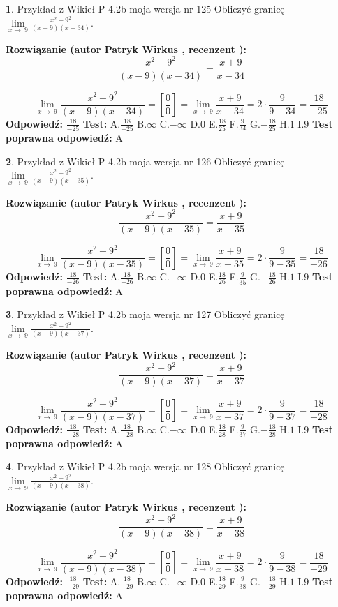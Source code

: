 \documentclass[12pt, a4paper]{article}
\theoremstyle{definition} %
\newtheorem{zad}{}
\newcommand{\zadStart}[1]{\begin{zad}#1\newline}
\newcommand{\zadStop}{\end{zad}}
\newcommand{\rozwStart}[2]{\noindent \textbf{Rozwiązanie (autor #1 , recenzent #2): }\newline}
\newcommand{\rozwStop}{\newline}
\newcommand{\odpStart}{\noindent \textbf{Odpowiedź:}\newline}
\newcommand{\odpStop}{\newline}
\newcommand{\testStart}{\noindent \textbf{Test:}\newline}
\newcommand{\testStop}{\newline}
\newcommand{\kluczStart}{\noindent \textbf{Test poprawna odpowiedź:}\newline}
\newcommand{\kluczStop}{\newline}
\begin{document}
\zadStart{Przykład z Wikieł P 4.2b moja wersja nr 125}
Obliczyć granicę $\lim\limits_{x\to\ 9}\frac{x^{2}-9^{2}}{(x-9)(x-34)}$.
\zadStop
\rozwStart{Patryk Wirkus}{}
$$\frac{x^{2}-9^{2}}{(x-9)(x-34)}=\frac{x+9}{x-34}$$

$$\lim\limits_{x\to\ 9}\frac{x^{2}-9^{2}}{(x-9)(x-34)}=[\frac{0}{0}]=\lim\limits_{x\to\ 9}\frac{x+9}{x-34}=2 \cdot \frac{9}{9-34} = \frac{18}{-25}$$
\rozwStop
\odpStart
$\frac{18}{-25}$
\odpStop
\testStart
A.$\frac{18}{-25}$
B.$\infty$
C.$-\infty$
D.$0$
E.$\frac{18}{25}$
F.$\frac{9}{34}$
G.$-\frac{18}{25}$
H.$1$
I.$9$
\testStop
\kluczStart
A
\kluczStop



\zadStart{Przykład z Wikieł P 4.2b moja wersja nr 126}
Obliczyć granicę $\lim\limits_{x\to\ 9}\frac{x^{2}-9^{2}}{(x-9)(x-35)}$.
\zadStop
\rozwStart{Patryk Wirkus}{}
$$\frac{x^{2}-9^{2}}{(x-9)(x-35)}=\frac{x+9}{x-35}$$

$$\lim\limits_{x\to\ 9}\frac{x^{2}-9^{2}}{(x-9)(x-35)}=[\frac{0}{0}]=\lim\limits_{x\to\ 9}\frac{x+9}{x-35}=2 \cdot \frac{9}{9-35} = \frac{18}{-26}$$
\rozwStop
\odpStart
$\frac{18}{-26}$
\odpStop
\testStart
A.$\frac{18}{-26}$
B.$\infty$
C.$-\infty$
D.$0$
E.$\frac{18}{26}$
F.$\frac{9}{35}$
G.$-\frac{18}{26}$
H.$1$
I.$9$
\testStop
\kluczStart
A
\kluczStop



\zadStart{Przykład z Wikieł P 4.2b moja wersja nr 127}
Obliczyć granicę $\lim\limits_{x\to\ 9}\frac{x^{2}-9^{2}}{(x-9)(x-37)}$.
\zadStop
\rozwStart{Patryk Wirkus}{}
$$\frac{x^{2}-9^{2}}{(x-9)(x-37)}=\frac{x+9}{x-37}$$

$$\lim\limits_{x\to\ 9}\frac{x^{2}-9^{2}}{(x-9)(x-37)}=[\frac{0}{0}]=\lim\limits_{x\to\ 9}\frac{x+9}{x-37}=2 \cdot \frac{9}{9-37} = \frac{18}{-28}$$
\rozwStop
\odpStart
$\frac{18}{-28}$
\odpStop
\testStart
A.$\frac{18}{-28}$
B.$\infty$
C.$-\infty$
D.$0$
E.$\frac{18}{28}$
F.$\frac{9}{37}$
G.$-\frac{18}{28}$
H.$1$
I.$9$
\testStop
\kluczStart
A
\kluczStop



\zadStart{Przykład z Wikieł P 4.2b moja wersja nr 128}
Obliczyć granicę $\lim\limits_{x\to\ 9}\frac{x^{2}-9^{2}}{(x-9)(x-38)}$.
\zadStop
\rozwStart{Patryk Wirkus}{}
$$\frac{x^{2}-9^{2}}{(x-9)(x-38)}=\frac{x+9}{x-38}$$

$$\lim\limits_{x\to\ 9}\frac{x^{2}-9^{2}}{(x-9)(x-38)}=[\frac{0}{0}]=\lim\limits_{x\to\ 9}\frac{x+9}{x-38}=2 \cdot \frac{9}{9-38} = \frac{18}{-29}$$
\rozwStop
\odpStart
$\frac{18}{-29}$
\odpStop
\testStart
A.$\frac{18}{-29}$
B.$\infty$
C.$-\infty$
D.$0$
E.$\frac{18}{29}$
F.$\frac{9}{38}$
G.$-\frac{18}{29}$
H.$1$
I.$9$
\testStop
\kluczStart
A
\kluczStop
\end{document}
